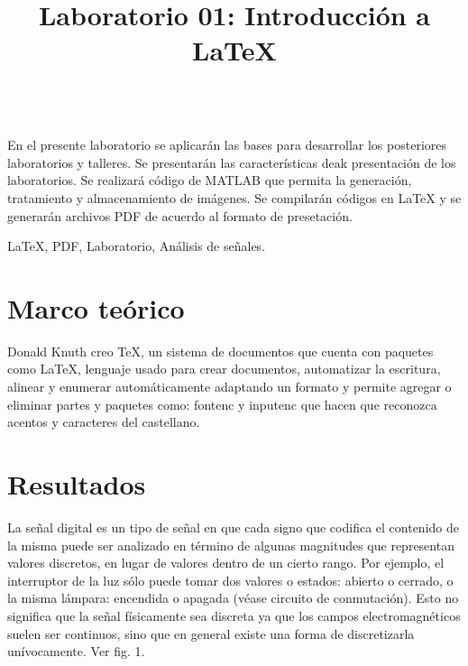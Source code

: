 \documentclass[conference,compsoc,onecolumn]{IEEEtran}
\begin{document}
\title{\normalfont Laboratorio 01: Introducción a \LaTeX{}}
\author{
}


 \maketitle
\IEEEoverridecommandlockouts
\IEEEpeerreviewmaketitle
    \\
\normalfont  \flushleft En el presente laboratorio se aplicarán las bases para desarrollar los posteriores laboratorios y talleres. Se presentarán las características deak presentación de los laboratorios. Se realizará código de MATLAB que permita la generación, tratamiento y almacenamiento de imágenes. Se compilarán códigos en \LaTeX{} y se generarán archivos
PDF de acuerdo al formato de presetación.



\begin{IEEEkeywords}
  \normalfont  \LaTeX{}, PDF, Laboratorio, Análisis de señales.
\end{IEEEkeywords}


\section{\normalfont Marco teórico}
\label{sec:introduction}
Donald Knuth creo \TeX{}, un sistema de documentos que cuenta con paquetes como \LaTeX{}, lenguaje usado para crear documentos, automatizar la escritura, alinear y enumerar automáticamente adaptando un formato y permite agregar o eliminar partes y paquetes como: {fontenc} y {inputenc} que hacen que reconozca acentos y caracteres del castellano.

\section{\normalfont Resultados}
\label{sec:results}
La señal digital es un tipo de señal en que cada signo que codifica el contenido de la misma puede ser analizado
en término de algunas magnitudes que representan valores discretos, en lugar de valores dentro de un cierto rango.
Por ejemplo, el interruptor de la luz sólo puede tomar dos valores o estados: abierto o cerrado, o la misma lámpara:
encendida o apagada (véase circuito de conmutación). Esto no significa que la señal físicamente sea discreta ya que los
campos electromagnéticos suelen ser continuos, sino que en general existe una forma de discretizarla unívocamente.
Ver fig. 1.
\end{document}
